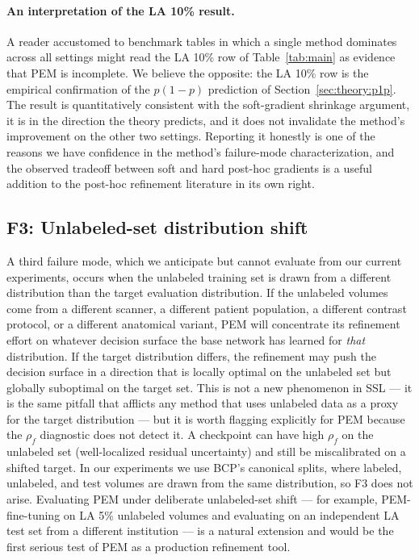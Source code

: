 \paragraph{An interpretation of the LA 10\% result.}
A reader accustomed to benchmark tables in which a single method dominates across all settings might read the LA 10\% row of Table~\ref{tab:main} as evidence that PEM is incomplete. We believe the opposite: the LA 10\% row is the empirical confirmation of the $p(1{-}p)$ prediction of Section~\ref{sec:theory:p1p}. The result is quantitatively consistent with the soft-gradient shrinkage argument, it is in the direction the theory predicts, and it does not invalidate the method's improvement on the other two settings. Reporting it honestly is one of the reasons we have confidence in the method's failure-mode characterization, and the observed tradeoff between soft and hard post-hoc gradients is a useful addition to the post-hoc refinement literature in its own right.

\subsection{F3: Unlabeled-set distribution shift}
\label{sec:disc:f3}

A third failure mode, which we anticipate but cannot evaluate from our current experiments, occurs when the unlabeled training set is drawn from a different distribution than the target evaluation distribution. If the unlabeled volumes come from a different scanner, a different patient population, a different contrast protocol, or a different anatomical variant, PEM will concentrate its refinement effort on whatever decision surface the base network has learned for \emph{that} distribution. If the target distribution differs, the refinement may push the decision surface in a direction that is locally optimal on the unlabeled set but globally suboptimal on the target set. This is not a new phenomenon in SSL --- it is the same pitfall that afflicts any method that uses unlabeled data as a proxy for the target distribution --- but it is worth flagging explicitly for PEM because the $\rho_f$ diagnostic does not detect it. A checkpoint can have high $\rho_f$ on the unlabeled set (well-localized residual uncertainty) and still be miscalibrated on a shifted target. In our experiments we use BCP's canonical splits, where labeled, unlabeled, and test volumes are drawn from the same distribution, so F3 does not arise. Evaluating PEM under deliberate unlabeled-set shift --- for example, PEM-fine-tuning on LA 5\% unlabeled volumes and evaluating on an independent LA test set from a different institution --- is a natural extension and would be the first serious test of PEM as a production refinement tool.

